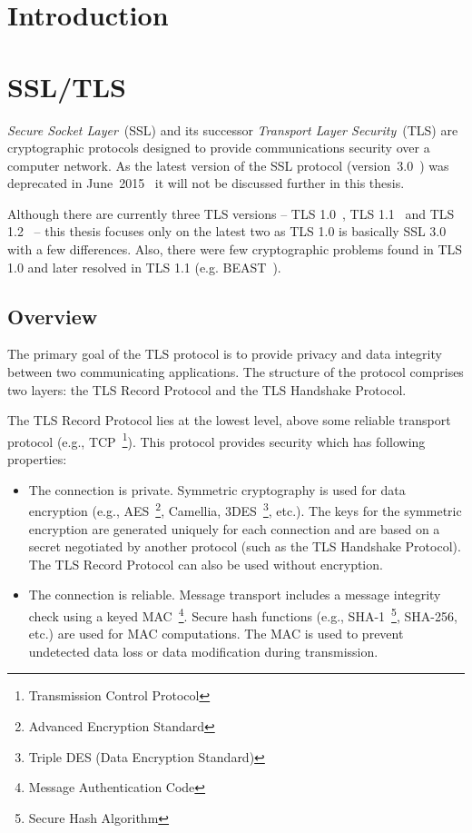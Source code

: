 
\chapter{Introduction}

\chapter{SSL/TLS}
    \textit{Secure Socket Layer}~(SSL) and its successor
    \textit{Transport Layer Security}~(TLS) are cryptographic protocols
    designed to provide communications security over a computer network. As
    the latest version of the SSL protocol (version~3.0~\cite{rfc6101}) was
    deprecated in June~2015~\cite{rfc7568} it will not be discussed
    further in this thesis.

    Although there are currently three TLS versions -- TLS 1.0~\cite{rfc2246},
    TLS 1.1~\cite{rfc4346} and TLS 1.2~\cite{rfc5246} -- this thesis focuses
    only on the latest two as TLS 1.0 is basically SSL 3.0 with a few
    differences. Also, there were few cryptographic problems found
    in TLS 1.0 and later resolved in TLS 1.1 (e.g. BEAST~\cite{duong2011}).

\section{Overview}\label{ref:overview}
    The primary goal of the TLS protocol is to provide privacy and data
    integrity between two communicating applications. The structure of
    the protocol comprises two layers: the TLS Record Protocol and
    the TLS Handshake Protocol.

    The TLS Record Protocol lies at the lowest level, above some reliable
    transport protocol (e.g., TCP~\footnote{Transmission Control Protocol}).
    This protocol provides security which has following properties:
    \begin{itemize}
        \item The connection is private. Symmetric cryptography is used
        for data encryption (e.g., AES~\footnote{Advanced Encryption Standard},
        Camellia, 3DES~\footnote{Triple DES (Data Encryption Standard)}, etc.).
        The keys for the symmetric encryption are generated uniquely
        for each connection
        and are based on a secret negotiated by another protocol
        (such as the TLS Handshake Protocol). The TLS Record Protocol can also
        be used without encryption.
        \item The connection is reliable. Message transport includes
        a message integrity check using a keyed
        MAC~\footnote{Message Authentication Code}. Secure hash functions
        (e.g., SHA-1~\footnote{Secure Hash Algorithm}, SHA-256, etc.) are
        used for MAC computations. The MAC is used to prevent undetected
        data loss or data modification during transmission.
    \end{itemize}

